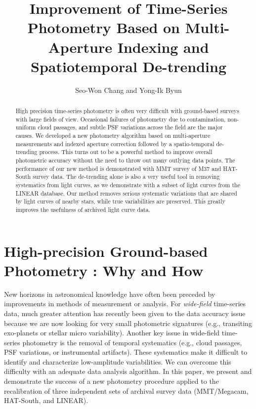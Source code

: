
\resetcounters



\title{Improvement of Time-Series Photometry Based on Multi-Aperture
Indexing and Spatiotemporal De-trending}
\author{Seo-Won Chang and Yong-Ik Byun}


\begin{abstract}
High precision time-series photometry is often very difficult with ground-based surveys with large fields of view.  Occasional failures of photometry due to contamination, non-uniform cloud passages, and subtle PSF variations across the field are the major causes.  We developed a new photometry algorithm based on multi-aperture measurements and indexed aperture correction followed by a spatio-temporal de-trending process.  This turns out to be a powerful method to improve overall photometric accuracy without the need to throw out many outlying data points.  The performance of our new method is demonstrated with MMT survey of M37 and HAT-South survey data.  The de-trending alone is also a very useful tool in removing systematics from light curves, as we demonstrate with a subset of light curves from the LINEAR database.  Our method removes serious systematic variations that are shared by light curves of nearby stars, while true variabilities are preserved.  This greatly improves the usefulness of archived light curve data.
\end{abstract}


\section{High-precision Ground-based Photometry : Why and How}
New horizons in astronomical knowledge have often been preceded by improvements in methods of measurement or analysis.  For {\itshape wide-field} time-series data, much greater attention has recently been given to the data accuracy issue because we are now looking for very small photometric signatures (e.g., transiting exo-planets or stellar micro variability).  Another key issue in wide-field time-series photometry is the removal of temporal systematics (e.g., cloud passages, PSF variations, or instrumental artifacts).  These systematics make it difficult to identify and characterize low-amplitude variabilities.  We can overcome this difficulty with an adequate data analysis algorithm.  In this paper, we present and demonstrate the success of a new photometry procedure applied to the recalibration of three independent sets of archival survey data (MMT/Megacam, HAT-South, and LINEAR).


